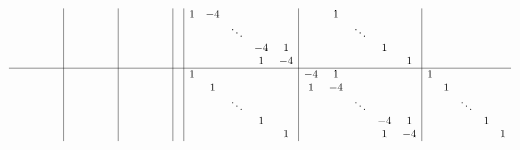 \documentclass[10pt, oneside, letterpaper]{article}
\begin{document}
\begin{align*}
{\begin{array}{c c c c c | c c c c c | c c c c c | c | c c c c c | c c c c c | c c c c c}
        &        &        &        &        &        &        &        &        &        &        &        &        &        &        &        &    1   &   -4   &        &        &        &        &    1   &        &        &        &        &        &        &        &        \\
        &        &        &        &        &        &        &        &        &        &        &        &        &        &        &        &        &        & \ddots &        &        &        &        & \ddots &        &        &        &        &        &        &        \\
        &        &        &        &        &        &        &        &        &        &        &        &        &        &        &        &        &        &        &   -4   &    1   &        &        &        &    1   &        &        &        &        &        &        \\
        &        &        &        &        &        &        &        &        &        &        &        &        &        &        &        &        &        &        &    1   &   -4   &        &        &        &        &    1   &        &        &        &        &        \\
\hline
        &        &        &        &        &        &        &        &        &        &        &        &        &        &        &        &    1   &        &        &        &        &   -4   &    1   &        &        &        &    1   &        &        &        &        \\
        &        &        &        &        &        &        &        &        &        &        &        &        &        &        &        &        &    1   &        &        &        &    1   &   -4   &        &        &        &        &    1   &        &        &        \\
        &        &        &        &        &        &        &        &        &        &        &        &        &        &        &        &        &        & \ddots &        &        &        &        & \ddots &        &        &        &        & \ddots &        &        \\
        &        &        &        &        &        &        &        &        &        &        &        &        &        &        &        &        &        &        &    1   &        &        &        &        &   -4   &    1   &        &        &        &    1   &        \\
        &        &        &        &        &        &        &        &        &        &        &        &        &        &        &        &        &        &        &        &    1   &        &        &        &    1   &   -4   &        &        &        &        &    1   \\

\end{array}}
\end{align*}
\end{document}
